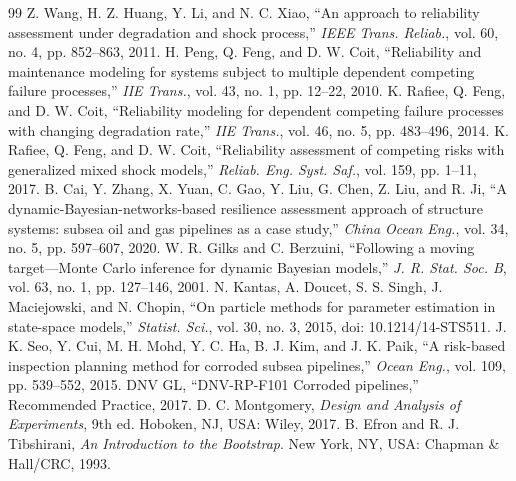 \documentclass[journal]{IEEEtran}
\begin{document}
\begin{thebibliography}{99}
 Z. Wang, H. Z. Huang, Y. Li, and N. C. Xiao, ``An approach to reliability assessment under degradation and shock process,'' \emph{IEEE Trans. Reliab.}, vol. 60, no. 4, pp. 852--863, 2011.
 H. Peng, Q. Feng, and D. W. Coit, ``Reliability and maintenance modeling for systems subject to multiple dependent competing failure processes,'' \emph{IIE Trans.}, vol. 43, no. 1, pp. 12--22, 2010.
 K. Rafiee, Q. Feng, and D. W. Coit, ``Reliability modeling for dependent competing failure processes with changing degradation rate,'' \emph{IIE Trans.}, vol. 46, no. 5, pp. 483--496, 2014.
 K. Rafiee, Q. Feng, and D. W. Coit, ``Reliability assessment of competing risks with generalized mixed shock models,'' \emph{Reliab. Eng. Syst. Saf.}, vol. 159, pp. 1--11, 2017.
 B. Cai, Y. Zhang, X. Yuan, C. Gao, Y. Liu, G. Chen, Z. Liu, and R. Ji, ``A dynamic-Bayesian-networks-based resilience assessment approach of structure systems: subsea oil and gas pipelines as a case study,'' \emph{China Ocean Eng.}, vol. 34, no. 5, pp. 597--607, 2020.
 W. R. Gilks and C. Berzuini, ``Following a moving target---Monte Carlo inference for dynamic Bayesian models,'' \emph{J. R. Stat. Soc. B}, vol. 63, no. 1, pp. 127--146, 2001.
 N. Kantas, A. Doucet, S. S. Singh, J. Maciejowski, and N. Chopin, ``On particle methods for parameter estimation in state-space models,'' \emph{Statist. Sci.}, vol. 30, no. 3, 2015, doi: 10.1214/14-STS511.
 J. K. Seo, Y. Cui, M. H. Mohd, Y. C. Ha, B. J. Kim, and J. K. Paik, ``A risk-based inspection planning method for corroded subsea pipelines,'' \emph{Ocean Eng.}, vol. 109, pp. 539--552, 2015.
 DNV GL, ``DNV-RP-F101 Corroded pipelines,'' Recommended Practice, 2017.
 D. C. Montgomery, \emph{Design and Analysis of Experiments}, 9th ed. Hoboken, NJ, USA: Wiley, 2017.
 B. Efron and R. J. Tibshirani, \emph{An Introduction to the Bootstrap}. New York, NY, USA: Chapman \& Hall/CRC, 1993.
\end{thebibliography}
\end{document}

